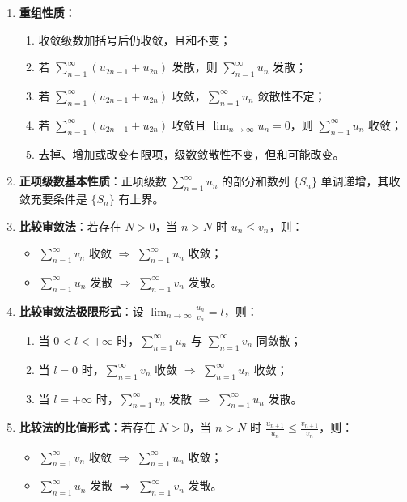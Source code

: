 \documentclass[UTF8]{ctexart}
\theoremstyle{remark}
\begin{document}
\begin{enumerate}
	\item \textbf{重组性质}：
	\begin{enumerate}
		\item 收敛级数加括号后仍收敛，且和不变；
		\item 若 \(\sum_{n=1}^{\infty} (u_{2n-1} + u_{2n})\) 发散，则 \(\sum_{n=1}^{\infty} u_n\) 发散；
		\item 若 \(\sum_{n=1}^{\infty} (u_{2n-1} + u_{2n})\) 收敛，\(\sum_{n=1}^{\infty} u_n\) 敛散性不定；
		\item 若 \(\sum_{n=1}^{\infty} (u_{2n-1} + u_{2n})\) 收敛且 \(\lim_{n \to \infty} u_n = 0\)，则 \(\sum_{n=1}^{\infty} u_n\) 收敛；
		\item 去掉、增加或改变有限项，级数敛散性不变，但和可能改变。
	\end{enumerate}
	
	\item \textbf{正项级数基本性质}：正项级数 \(\sum_{n=1}^{\infty} u_n\) 的部分和数列 \(\{S_n\}\) 单调递增，其收敛充要条件是 \(\{S_n\}\) 有上界。
	
	\item \textbf{比较审敛法}：若存在 \(N > 0\)，当 \(n > N\) 时 \(u_n \leq v_n\)，则：
	\begin{itemize}
		\item \(\sum_{n=1}^{\infty} v_n\) 收敛 \(\Rightarrow\) \(\sum_{n=1}^{\infty} u_n\) 收敛；
		\item \(\sum_{n=1}^{\infty} u_n\) 发散 \(\Rightarrow\) \(\sum_{n=1}^{\infty} v_n\) 发散。
	\end{itemize}
	
	\item \textbf{比较审敛法极限形式}：设 \(\lim_{n \to \infty} \frac{u_n}{v_n} = l\)，则：
	\begin{enumerate}
		\item 当 \(0 < l < +\infty\) 时，\(\sum_{n=1}^{\infty} u_n\) 与 \(\sum_{n=1}^{\infty} v_n\) 同敛散；
		\item 当 \(l = 0\) 时，\(\sum_{n=1}^{\infty} v_n\) 收敛 \(\Rightarrow\) \(\sum_{n=1}^{\infty} u_n\) 收敛；
		\item 当 \(l = +\infty\) 时，\(\sum_{n=1}^{\infty} v_n\) 发散 \(\Rightarrow\) \(\sum_{n=1}^{\infty} u_n\) 发散。
	\end{enumerate}
	
	\item \textbf{比较法的比值形式}：若存在 \(N > 0\)，当 \(n > N\) 时 \(\frac{u_{n+1}}{u_n} \leq \frac{v_{n+1}}{v_n}\)，则：
	\begin{itemize}
		\item \(\sum_{n=1}^{\infty} v_n\) 收敛 \(\Rightarrow\) \(\sum_{n=1}^{\infty} u_n\) 收敛；
		\item \(\sum_{n=1}^{\infty} u_n\) 发散 \(\Rightarrow\) \(\sum_{n=1}^{\infty} v_n\) 发散。
	\end{itemize}
	

\end{enumerate}
\end{document}
